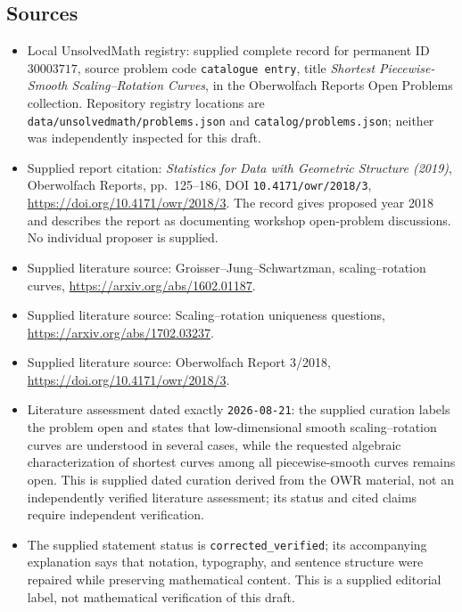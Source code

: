 \documentclass[11pt]{article}
\begin{document}
\subsection{Sources}
\begin{itemize}
\item Local UnsolvedMath registry: supplied complete record for permanent ID \(30003717\), source problem code \texttt{catalogue entry}, title \emph{Shortest Piecewise-Smooth Scaling--Rotation Curves}, in the Oberwolfach Reports Open Problems collection. Repository registry locations are \texttt{data/unsolvedmath/problems.json} and \texttt{catalog/problems.json}; neither was independently inspected for this draft.
\item Supplied report citation: \emph{Statistics for Data with Geometric Structure (2019)}, Oberwolfach Reports, pp.\ 125--186, DOI \texttt{10.4171/owr/2018/3}, \url{https://doi.org/10.4171/owr/2018/3}. The record gives proposed year 2018 and describes the report as documenting workshop open-problem discussions. No individual proposer is supplied.
\item Supplied literature source: Groisser--Jung--Schwartzman, scaling--rotation curves, \url{https://arxiv.org/abs/1602.01187}.
\item Supplied literature source: Scaling--rotation uniqueness questions, \url{https://arxiv.org/abs/1702.03237}.
\item Supplied literature source: Oberwolfach Report 3/2018, \url{https://doi.org/10.4171/owr/2018/3}.
\item Literature assessment dated exactly \texttt{2026-08-21}: the supplied curation labels the problem open and states that low-dimensional smooth scaling--rotation curves are understood in several cases, while the requested algebraic characterization of shortest curves among all piecewise-smooth curves remains open. This is supplied dated curation derived from the OWR material, not an independently verified literature assessment; its status and cited claims require independent verification.
\item The supplied statement status is \texttt{corrected\_verified}; its accompanying explanation says that notation, typography, and sentence structure were repaired while preserving mathematical content. This is a supplied editorial label, not mathematical verification of this draft.
\end{itemize}
\end{document}
